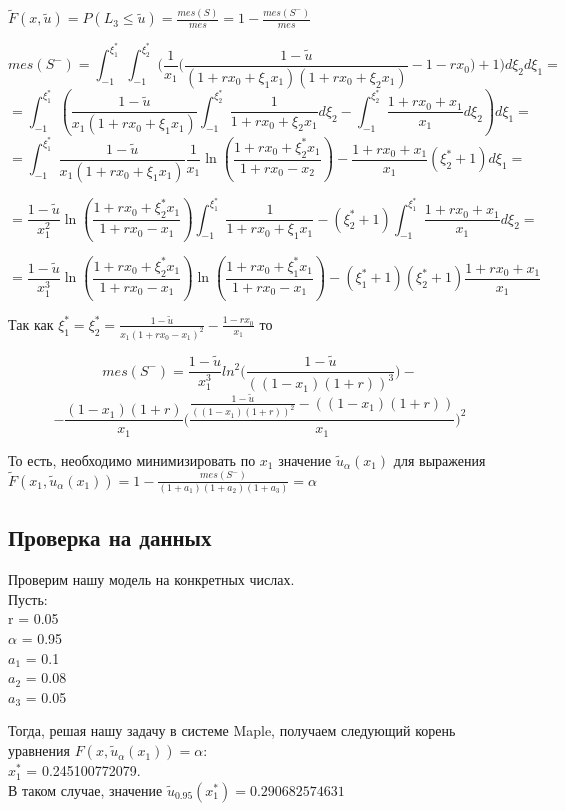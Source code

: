 \documentclass[18pt,a4paper]{article}
\theoremstyle{plain}
\theoremstyle{definition}
\begin{document}
$\tilde{F}(x,\tilde{u}) = P(L_3 \le \tilde{u})= \frac{mes(S)}{mes} = 1 - \frac{mes(S^-)}{mes}$


$$
mes(S^-) = \int_{-1}^{\xi_1^*} \int_{-1}^{\xi_2^*} \Big(\frac{1}{x_1} \big(\frac{1-\tilde{u}}{(1+rx_0+\xi_1 x_1)(1+rx_0+\xi_2 x_1)} -1 -rx_0\big)+1\Big)d\xi_2 d\xi_1 =
$$
$$
= \int_{-1}^{\xi_1^*}( \frac{1-\tilde{u}}{x_1(1+rx_0+\xi_1 x_1)}\int_{-1}^{\xi_2^*}\frac{1}{1+rx_0+\xi_2 x_1}d\xi_2 - \int_{-1}^{\xi_2^*}\frac{1+rx_0+ x_1}{x_1}d\xi_2) d\xi_1 =
$$
$$
= \int_{-1}^{\xi_1^*} \frac{1-\tilde{u}}{x_1(1+rx_0+\xi_1 x_1)}\frac{1}{x_1}\ln(\frac{1+rx_0+\xi_2^* x_1}{1+rx_0-x_2}) - \frac{1+rx_0+ x_1}{x_1}(\xi_2^*+1) d\xi_1 =
$$

$$
= \frac{1-\tilde{u}}{x_1^2}\ln(\frac{1+rx_0+\xi_2^* x_1}{1+rx_0-x_1})\int_{-1}^{\xi_1^*}\frac{1}{1+rx_0+\xi_1 x_1}-(\xi_2^*+1)\int_{-1}^{\xi_1^*}\frac{1+rx_0+ x_1}{x_1}d\xi_2 =
$$

$$
= \frac{1-\tilde{u}}{x_1^3}\ln(\frac{1+rx_0+\xi_2^* x_1}{1+rx_0-x_1})\ln(\frac{1+rx_0+\xi_1^* x_1}{1+rx_0-x_1})-(\xi_1^*+1)(\xi_2^*+1)\frac{1+rx_0+x_1}{x_1}
$$

Так как $\xi_1^* = \xi_2^* = \frac{ 1-\tilde{u} }{ x_1(1+rx_0-x_1)^2 } - \frac{1 -rx_0}{x_1}$ то

$$
mes(S^-) = \frac{1-\tilde{u}}{x_1^3} ln^{2}\Big(\frac{1-\tilde{u}}{((1-x_1)(1+r))^3}\Big)-
$$
$$
-\frac{(1-x_1)(1+r)}{x_1}\Bigg(\frac{\frac{1-\tilde{u}}{((1-x_1)(1+r))^{2}} - ((1-x_1)(1+r))}{x_1}\Bigg)^{2}
$$

То есть, необходимо минимизировать по $x_1$ значение $\tilde{u}_\alpha(x_1)$ для выражения $\tilde{F}(x_1,\tilde{u}_\alpha(x_1))=1-\frac{mes(S^-)}{(1+a_1)(1+a_2)(1+a_3)} = \alpha$\\

\centering\subsection{Проверка на данных}
\vspace{2pc}
\flushleft

Проверим нашу модель на конкретных числах.\\
Пусть:\\
r = 0.05\\
$\alpha$ = 0.95\\
$a_1$ = 0.1\\
$a_2$ = 0.08\\
$a_3$ = 0.05

Тогда, решая нашу задачу в системе Maple, получаем следующий корень уравнения $F (x,\tilde{u}_\alpha(x_1)) = \alpha$:\\
$x_1^*$ = 0.245100772079.\\
В таком случае, значение $\tilde{u}_{0.95}(x_1^*) = 0.290682574631$
\end{document}
